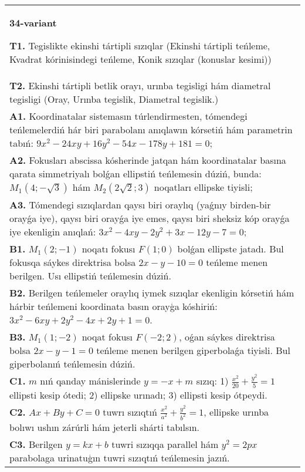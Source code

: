 \documentclass{article}
\begin{document}
\begin{tabular}{m{17cm}}
\textbf{34-variant}
\newline

\textbf{T1.} Tegislikte ekinshi tártipli sızıqlar (Ekinshi tártipli teńleme, Kvadrat kórinisindegi teńleme, Konik sızıqlar (konuslar kesimi)) \\
\textbf{T2.} Ekinshi tártipli betlik orayı, urınba tegisligi hám diametral tegisligi (Oray, Urınba tegislik, Diametral tegislik.) \\
\textbf{A1.} Koordinatalar sistemasın túrlendirmesten, tómendegi teńlemelerdiń hár biri parabolanı anıqlawın kórsetiń hám parametrin tabıń: $9 x^2-24 x y+16 y^2-54 x-178 y+181=0$; \\
\textbf{A2.} Fokusları abscissa kósherinde jatqan hám koordinatalar basına qarata simmetriyalı bolǵan ellipstiń teńlemesin dúziń, bunda: $M_1 (4;-\sqrt{3}) $ hám $M_2 (2 \sqrt{2}; 3)$ noqatları ellipske tiyisli; \\
\textbf{A3.} Tómendegi sızıqlardan qaysı biri oraylıq (yaǵnıy birden-bir orayǵa iye), qaysı biri orayǵa iye emes, qaysı biri sheksiz kóp orayǵa iye ekenligin anıqlań: $3 x^2-4 x y-2 y^2+3 x-12 y-7=0$; \\
\textbf{B1.} $M_1 (2;-1) $ noqatı fokusı $F (1;0) $ bolǵan ellipste jatadı. Bul fokusqa sáykes direktrisa bolsa $2x-y-10=0$ teńleme menen berilgen. Usı ellipstiń teńlemesin dúziń. \\
\textbf{B2.} Berilgen teńlemeler oraylıq iymek sızıqlar ekenligin kórsetiń hám hárbir teńlemeni koordinata basın orayģa kóshiriń: $3x^2-6xy+2y^2-4x+2y+1=0$. \\
\textbf{B3.} $M_1 (1;-2) $ noqat fokusı $F (-2; 2) $, oǵan sáykes direktrisa bolsa $2x-y-1=0$ teńleme menen berilgen giperbolaǵa tiyisli. Bul giperbolanıń teńlemesin dúziń. \\
\textbf{C1.} $m$ nıń qanday mánislerinde $y=-x+m$ sızıq: 1) $\frac{x^2}{20}+\frac{y^2}{5}=1$ ellipsti kesip ótedi; 2) ellipske urınadı; 3) ellipsti kesip ótpeydi. \\
\textbf{C2.} $A x+B y+C=0$ tuwrı sızıqtıń $\frac{x^2}{a^2}+\frac{y^2}{b^2}=1$, ellipske urınba bolıwı ushın zárúrli hám jeterli shárti tabılsın. \\
\textbf{C3.} Berilgen $y=k x+b$ tuwri sızıqqa parallel hám $y^2=2 p x$ parabolaga urinatuģın tuwri sızıqtıń teńlemesin jazıń. \\

\end{tabular}
\vspace{1cm}
\end{document}
